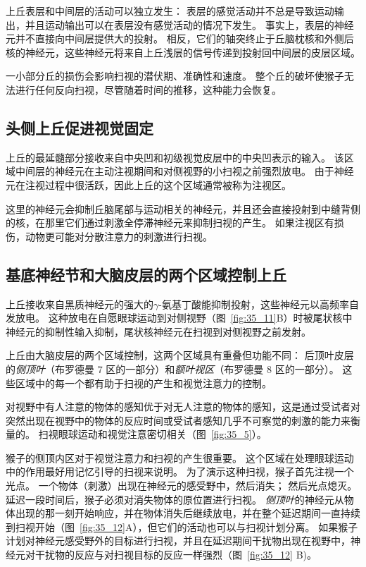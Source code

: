 上丘表层和中间层的活动可以独立发生：
表层的感觉活动并不总是导致运动输出，并且运动输出可以在表层没有感觉活动的情况下发生。
事实上，表层的神经元并不直接向中间层提供大的投射。
相反，它们的轴突终止于丘脑枕核和外侧后核的神经元，这些神经元将来自上丘浅层的信号传递到投射回中间层的皮层区域。


一小部分丘的损伤会影响扫视的潜伏期、准确性和速度。
整个丘的破坏使猴子无法进行任何反向扫视，尽管随着时间的推移，这种能力会恢复。



\subsection{头侧上丘促进视觉固定}

上丘的最延髓部分接收来自中央凹和初级视觉皮层中的中央凹表示的输入。
该区域中间层的神经元在主动注视期间和对侧视野的小扫视之前强烈放电。
由于神经元在注视过程中很活跃，因此上丘的这个区域通常被称为注视区。


这里的神经元会抑制丘脑尾部与运动相关的神经元，并且还会直接投射到中缝背侧的核，在那里它们通过刺激全停滞神经元来抑制扫视的产生。
如果注视区有损伤，动物更可能对分散注意力的刺激进行扫视。



\subsection{基底神经节和大脑皮层的两个区域控制上丘}

上丘接收来自黑质神经元的强大的$\gamma$-氨基丁酸能抑制投射，这些神经元以高频率自发放电。
这种放电在自愿眼球运动到对侧视野（图~\ref{fig:35_11}B）时被尾状核中神经元的抑制性输入抑制，尾状核神经元在扫视到对侧视野之前发射。


上丘由大脑皮层的两个区域控制，这两个区域具有重叠但功能不同：
后顶叶皮层的\textit{侧顶叶}（布罗德曼 7 区的一部分）和\textit{额叶视区}（布罗德曼 8 区的一部分）。 
这些区域中的每一个都有助于扫视的产生和视觉注意力的控制。


对视野中有人注意的物体的感知优于对无人注意的物体的感知，这是通过受试者对突然出现在视野中的物体的反应时间或受试者感知几乎不可察觉的刺激的能力来衡量的。
扫视眼球运动和视觉注意密切相关（图~\ref{fig:35_5}）。


猴子的侧顶内区对于视觉注意力和扫视的产生很重要。
这个区域在处理眼球运动中的作用最好用记忆引导的扫视来说明。
为了演示这种扫视，猴子首先注视一个光点。
一个物体（刺激）出现在神经元的感受野中，然后消失；
然后光点熄灭。
延迟一段时间后，猴子必须对消失物体的原位置进行扫视。
\textit{侧顶叶}的神经元从物体出现的那一刻开始响应，并在物体消失后继续放电，并在整个延迟期间一直持续到扫视开始（图~\ref{fig:35_12}A），但它们的活动也可以与扫视计划分离。
如果猴子计划对神经元感受野外的目标进行扫视，并且在延迟期间干扰物出现在视野中，神经元对干扰物的反应与对扫视目标的反应一样强烈（图~\ref{fig:35_12} B)。


